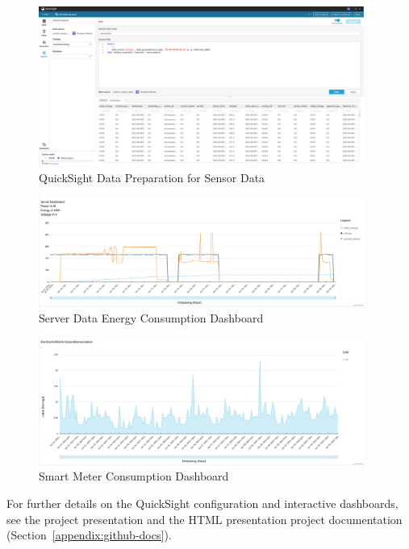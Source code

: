 \begin{figure}[H]
    \centering
    \includegraphics[width=0.95\textwidth]{fig/sensordata_Data Prep.png}
    \caption{QuickSight Data Preparation for Sensor Data}
\end{figure}

\begin{figure}[H]
    \centering
    \includegraphics[width=0.95\textwidth]{fig/server_data_Energyconsumption Dashboard.png}
    \caption{Server Data Energy Consumption Dashboard}
\end{figure}

\begin{figure}[H]
    \centering
    \includegraphics[width=0.95\textwidth]{fig/smart_meterconsumptionEnergyconsumption Dashboard.png}
    \caption{Smart Meter Consumption Dashboard}
\end{figure}

For further details on the QuickSight configuration and interactive dashboards, see the project presentation and the HTML presentation project documentation (Section~\ref{appendix:github-docs}).

